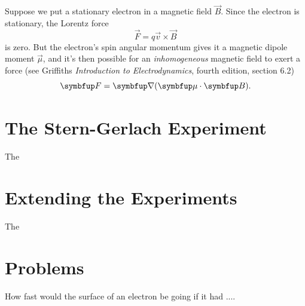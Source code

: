 Suppose we put a stationary electron in a magnetic field $\vec{B}$.  Since the electron is stationary, the Lorentz force
\[
\vec{F} = q\vec{v} \times \vec{B}
\]
is zero.  But the electron's spin angular momentum gives it a magnetic dipole moment $\vec{\mu}$, and it's then possible for an \emph{inhomogeneous} magnetic field to exert a force (see Griffiths \emph{Introduction to Electrodynamics}, fourth edition, section 6.2)
\begin{equation}
\vec{F} = \grad (\vec{\mu} \cdot \vec{B}).
\end{equation}



%
%
%

\section{The Stern-Gerlach Experiment}

The 

%
%
%

\section{Extending the Experiments}

The 

%
%
%



\section*{Problems}
%

\begin{problem}
How fast would the surface of an electron be going if it had ....
\end{problem}

